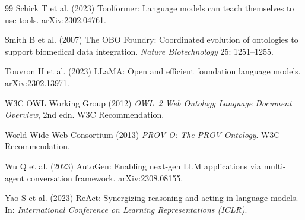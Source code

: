 \documentclass[Afour,sageh,times]{sagej}
\begin{document}
\begin{thebibliography}{99}
Schick T et al. (2023) Toolformer: Language models can teach themselves to use tools. arXiv:2302.04761.

Smith B et al. (2007) The OBO Foundry: Coordinated evolution of ontologies to support biomedical
data integration. \textit{Nature Biotechnology} 25: 1251--1255.

Touvron H et al. (2023) LLaMA: Open and efficient foundation language models. arXiv:2302.13971.

W3C OWL Working Group (2012) \textit{OWL~2 Web Ontology Language Document Overview}, 2nd edn.
W3C Recommendation.

World Wide Web Consortium (2013) \textit{PROV-O: The PROV Ontology}. W3C Recommendation.

Wu Q et al. (2023) AutoGen: Enabling next-gen LLM applications via multi-agent conversation
framework. arXiv:2308.08155.

Yao S et al. (2023) ReAct: Synergizing reasoning and acting in language models. In:
\textit{International Conference on Learning Representations (ICLR)}.

\end{thebibliography}
\end{document}
